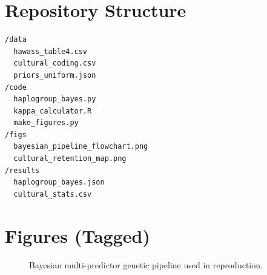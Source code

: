 \documentclass[11pt]{article}
\begin{document}
\section{Repository Structure}
\begin{verbatim}
/data
  hawass_table4.csv
  cultural_coding.csv
  priors_uniform.json
/code
  haplogroup_bayes.py
  kappa_calculator.R
  make_figures.py
/figs
  bayesian_pipeline_flowchart.png
  cultural_retention_map.png
/results
  haplogroup_bayes.json
  cultural_stats.csv
\end{verbatim}

\section{Figures (Tagged)}

\begin{figure}[htbp]
  \centering
  \caption{Bayesian multi-predictor genetic pipeline used in reproduction.}
  \label{fig:bayes-flow}
\end{figure}
\end{document}
